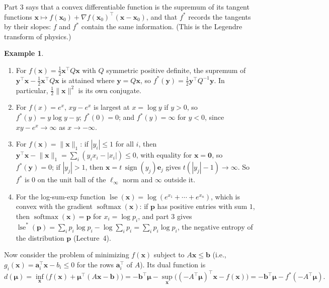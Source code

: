 \documentclass[11pt]{article}
\newcommand{\norm}[1]{\lVert #1 \rVert}
\theoremstyle{definition}
\newtheorem{example}[definition]{Example}
\theoremstyle{plain}
\theoremstyle{remark}
\DeclareMathOperator{\sign}{sign}
\DeclareMathOperator{\softmax}{softmax}
\begin{document}
Part 3 says that a convex differentiable function is the supremum of its tangent functions $\mathbf{x} \mapsto f(\mathbf{x}_0) + \nabla f(\mathbf{x}_0)^\top(\mathbf{x} - \mathbf{x}_0)$, and that $f^*$ records the tangents by their slopes: $f$ and $f^*$ contain the same information. (This is the Legendre transform of physics.)

\begin{example}\label{ex:conjugates}
    \begin{enumerate}
        \item For $f(\mathbf{x}) = \frac{1}{2}\mathbf{x}^\top Q\mathbf{x}$ with $Q$ symmetric positive definite, the supremum of $\mathbf{y}^\top\mathbf{x} - \frac{1}{2}\mathbf{x}^\top Q\mathbf{x}$ is attained where $\mathbf{y} = Q\mathbf{x}$, so $f^*(\mathbf{y}) = \frac{1}{2}\mathbf{y}^\top Q^{-1}\mathbf{y}$. In particular, $\frac{1}{2}\norm{\mathbf{x}}^2$ is its own conjugate.
        \item For $f(x) = e^x$, $xy - e^x$ is largest at $x = \log y$ if $y > 0$, so $f^*(y) = y\log y - y$; $f^*(0) = 0$; and $f^*(y) = \infty$ for $y < 0$, since $xy - e^x \to \infty$ as $x \to -\infty$.
        \item For $f(\mathbf{x}) = \norm{\mathbf{x}}_1$: if $|y_i| \leq 1$ for all $i$, then $\mathbf{y}^\top\mathbf{x} - \norm{\mathbf{x}}_1 = \sum_i (y_ix_i - |x_i|) \leq 0$, with equality for $\mathbf{x} = \mathbf{0}$, so $f^*(\mathbf{y}) = 0$; if $|y_j| > 1$, then $\mathbf{x} = t\,\sign(y_j)\mathbf{e}_j$ gives $t(|y_j| - 1) \to \infty$. So $f^*$ is $0$ on the unit ball of the $\ell_\infty$ norm and $\infty$ outside it.
        \item For the log-sum-exp function $\operatorname{lse}(\mathbf{x}) = \log(e^{x_1} + \cdots + e^{x_n})$, which is convex with the gradient $\softmax(\mathbf{x})$: if $\mathbf{p}$ has positive entries with sum $1$, then $\softmax(\mathbf{x}) = \mathbf{p}$ for $x_i = \log p_i$, and part 3 gives $\operatorname{lse}^*(\mathbf{p}) = \sum_i p_i\log p_i - \log\sum_i p_i = \sum_i p_i\log p_i$, the negative entropy of the distribution $\mathbf{p}$ (Lecture~4).
    \end{enumerate}
\end{example}

Now consider the problem of minimizing $f(\mathbf{x})$ subject to $A\mathbf{x} \leq \mathbf{b}$ (i.e., $g_i(\mathbf{x}) = \mathbf{a}_i^\top\mathbf{x} - b_i \leq 0$ for the rows $\mathbf{a}_i^\top$ of $A$). Its dual function is
\[d(\boldsymbol{\mu}) = \inf_{\mathbf{x}}\big(f(\mathbf{x}) + \boldsymbol{\mu}^\top(A\mathbf{x} - \mathbf{b})\big) = -\mathbf{b}^\top\boldsymbol{\mu} - \sup_{\mathbf{x}}\big((-A^\top\boldsymbol{\mu})^\top\mathbf{x} - f(\mathbf{x})\big) = -\mathbf{b}^\top\boldsymbol{\mu} - f^*(-A^\top\boldsymbol{\mu}).\]
\end{document}
